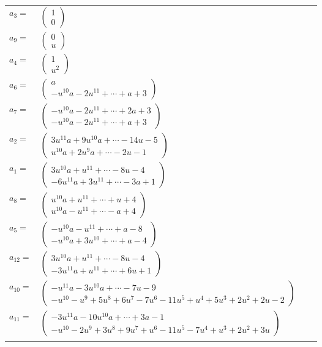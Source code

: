 \documentclass[1p]{elsarticle_modified}
\theoremstyle{definition}
\begin{document}
\begin{tabular}{m{7pt} m{180pt} m{7pt} m{180pt} }
\flushright $a_{3}=$&$\begin{pmatrix}1\\0\end{pmatrix}$ \\
\flushright $a_{9}=$&$\begin{pmatrix}0\\u\end{pmatrix}$ \\
\flushright $a_{4}=$&$\begin{pmatrix}1\\u^2\end{pmatrix}$ \\
\flushright $a_{6}=$&$\begin{pmatrix}a\\- u^{10} a-2 u^{11}+\cdots+a+3\end{pmatrix}$ \\
\flushright $a_{7}=$&$\begin{pmatrix}- u^{10} a-2 u^{11}+\cdots+2 a+3\\- u^{10} a-2 u^{11}+\cdots+a+3\end{pmatrix}$ \\
\flushright $a_{2}=$&$\begin{pmatrix}3 u^{11} a+9 u^{10} a+\cdots-14 u-5\\u^{10} a+2 u^9 a+\cdots-2 u-1\end{pmatrix}$ \\
\flushright $a_{1}=$&$\begin{pmatrix}3 u^{10} a+u^{11}+\cdots-8 u-4\\-6 u^{11} a+3 u^{11}+\cdots-3 a+1\end{pmatrix}$ \\
\flushright $a_{8}=$&$\begin{pmatrix}u^{10} a+u^{11}+\cdots+u+4\\u^{10} a- u^{11}+\cdots- a+4\end{pmatrix}$ \\
\flushright $a_{5}=$&$\begin{pmatrix}- u^{10} a- u^{11}+\cdots+a-8\\- u^{10} a+3 u^{10}+\cdots+a-4\end{pmatrix}$ \\
\flushright $a_{12}=$&$\begin{pmatrix}3 u^{10} a+u^{11}+\cdots-8 u-4\\-3 u^{11} a+u^{11}+\cdots+6 u+1\end{pmatrix}$ \\
\flushright $a_{10}=$&$\begin{pmatrix}- u^{11} a-3 u^{10} a+\cdots-7 u-9\\- u^{10}- u^9+5 u^8+6 u^7-7 u^6-11 u^5+u^4+5 u^3+2 u^2+2 u-2\end{pmatrix}$ \\
\flushright $a_{11}=$&$\begin{pmatrix}-3 u^{11} a-10 u^{10} a+\cdots+3 a-1\\- u^{10}-2 u^9+3 u^8+9 u^7+u^6-11 u^5-7 u^4+u^3+2 u^2+3 u\end{pmatrix}$\\&\end{tabular}
\end{document}
